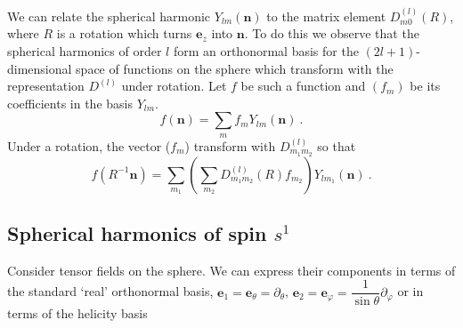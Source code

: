 \documentclass[12pt,a4paper]{article}
\renewcommand{\vec}[1]{\boldsymbol{#1}}
\begin{document}
We can relate the spherical harmonic $Y_{lm}(\vec{n})$ to the matrix element $D^{(l)}_{m0}(R)$, where $R$ is a rotation which turns $\vec{e}_z$ into $\vec{n}$. To do this we observe that the spherical harmonics of order $l$ form an orthonormal basis for the $(2l + 1)$-dimensional space of functions on the sphere which transform with the representation $D^{(l)}$ under rotation. Let $f$ be such a function and $(f_m)$ be its coefficients in the basis $Y_{lm}$.
\begin{equation}
f(\vec{n}) = \sum_m f_m Y_{lm} (\vec{n})  ~.
\end{equation}
Under a rotation, the vector ($f_m$) transform with $D^{(l)}_{m_1 m_2}$ so that 
\begin{equation}
f(R^{-1} \vec{n}) = \sum_{m_1} \left(\sum_{m_2} D^{(l)}_{m_1 m_2} (R) f_{m_2}  \right) Y_{lm_1} (\vec{n}) ~.
\end{equation}




























































\subsection{Spherical harmonics of spin $s^1$}
\cite{2008cmb..book.....D} Consider tensor fields on the sphere. We can express their components in terms of the standard `real' orthonormal basis, $\vec{e}_1 = \vec{e}_\theta = \partial_\theta$, $\vec{e}_2 = \vec{e}_\varphi = \dfrac{1}{\sin \theta} \partial_\varphi$ or in terms of the helicity basis




















\end{document}
